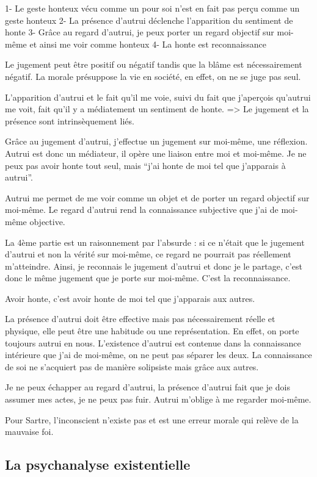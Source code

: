 \documentclass[french]{book}
\theoremstyle{definition}
\begin{document}
1- Le geste honteux vécu comme un pour soi n’est en fait pas perçu comme un geste honteux
2- La présence d’autrui déclenche l’apparition du sentiment de honte 
3- Grâce au regard d’autrui, je peux porter un regard objectif sur moi-même et ainsi me voir comme honteux
4- La honte est reconnaissance

Le jugement peut être positif ou négatif tandis que la blâme est nécessairement négatif.
La morale présuppose la vie en société, en effet, on ne se juge pas seul.

L’apparition d’autrui et le fait qu’il me voie, suivi du fait que j'aperçois qu'autrui me voit, fait qu’il y a médiatement un sentiment de honte.
=> Le jugement et la présence sont intrinsèquement liés.

Grâce au jugement d’autrui, j’effectue un jugement sur moi-même, une réflexion. Autrui est donc un médiateur, il opère une liaison entre moi et moi-même. Je ne peux pas avoir honte tout seul, mais “j’ai honte de moi tel que j’apparais à autrui”.

Autrui me permet de me voir comme un objet et de porter un regard objectif sur moi-même. Le regard d’autrui rend la connaissance subjective que j’ai de moi-même objective.

La 4ème partie est un raisonnement par l’absurde : si ce n’était que le jugement d’autrui et non la vérité sur moi-même, ce regard ne pourrait pas réellement m’atteindre. Ainsi, je reconnais le jugement d’autrui et donc je le partage, c’est donc le même jugement que je porte sur moi-même. C’est la reconnaissance.

Avoir honte, c’est avoir honte de moi tel que j’apparais aux autres.

La présence d’autrui doit être effective mais pas nécessairement réelle et physique, elle peut être une habitude ou une représentation. En effet, on porte toujours autrui en nous. 
L’existence d’autrui est contenue dans la connaissance intérieure que j'ai de moi-même, on ne peut pas séparer les deux. La connaissance de soi ne s’acquiert pas de manière solipsiste mais grâce aux autres. 


Je ne peux échapper au regard d’autrui, la présence d’autrui fait que je dois assumer mes actes, je ne peux pas fuir. Autrui m’oblige à me regarder moi-même.

Pour Sartre, l’inconscient n’existe pas et est une erreur morale qui relève de la mauvaise foi.


\subsection{La psychanalyse existentielle}
\end{document}

